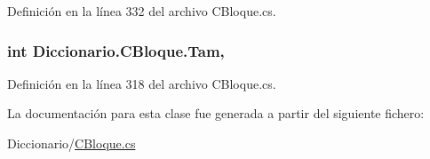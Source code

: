 Definición en la línea 332 del archivo C\-Bloque.\-cs.

\hypertarget{class_diccionario_1_1_c_bloque_a456cc21efdc91726438938a7ce5fa01f}{
\subsubsection[{Tam}]{\setlength{\rightskip}{0pt plus 5cm}int Diccionario.\-C\-Bloque.\-Tam\hspace{0.3cm}{\ttfamily [get]}, {\ttfamily [set]}}}\label{class_diccionario_1_1_c_bloque_a456cc21efdc91726438938a7ce5fa01f}


Definición en la línea 318 del archivo C\-Bloque.\-cs.



La documentación para esta clase fue generada a partir del siguiente fichero\-:\begin{DoxyCompactItemize}
\item 
Diccionario/\hyperlink{_c_bloque_8cs}{C\-Bloque.\-cs}\end{DoxyCompactItemize}
